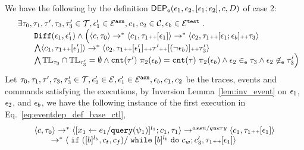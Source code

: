 \begin{subproof}
%
\label{pf:eventdep_base_ctl}
We have the following by the definition $\mathsf{DEP_{\mathtt{e}}}(\mathtt{\epsilon}_1, \mathtt{\epsilon}_2, [\mathtt{\epsilon}_1; \mathtt{\epsilon}_2], c, D)$ of case 2:
\begin{equation}
  \label{eq:eventdep_def_base_ctl}
  \begin{array}{ll}   
    & \exists \mathtt{\tau}_0,
    \mathtt{\tau}_1, \mathtt{\tau}', \mathtt{\tau}_3, \mathtt{\tau}_3' \in \mathcal{T},\mathtt{\epsilon}_1' \in \mathcal{E}^{\mathtt{{asn}}}, {c}_1, {c}_2  \in \mathcal{C}, 
    \mathtt{\epsilon}_b \in \mathcal{E}^{\mathtt{{test}}}
   ~.~ 
    \\ 
   &   \qquad    \mathtt{Diff}(\mathtt{\epsilon}_1, \mathtt{\epsilon}_1') 
\land
   \Big(
  \langle {c}, \mathtt{\tau}_0 \rangle \rightarrow^{*} 
      \langle {c}_1, \mathtt{\tau}_1 {\scriptscriptstyle ++} [\mathtt{\epsilon}_1] \rangle  \rightarrow^{*} 
      \langle c_2,  \mathtt{\tau}_1 {\scriptscriptstyle ++} [\mathtt{\epsilon}_1;\mathtt{\epsilon}_b] {\scriptscriptstyle ++}  \mathtt{\tau}_3 \rangle 
    \\   
   & \qquad \bigwedge 
    \langle {c}_1, \mathtt{\tau}_1 {\scriptscriptstyle ++} [\mathtt{\epsilon}_1'] \rangle  \rightarrow^{*} 
    \langle c_2,  \mathtt{\tau}_1 {\scriptscriptstyle ++} [\mathtt{\epsilon}_1'] {\scriptscriptstyle ++} \mathtt{\tau}' {\scriptscriptstyle ++} [(\neg \mathtt{\epsilon}_b)] {\scriptscriptstyle ++} \mathtt{\tau}_3' \rangle 
    \\
    & \qquad \bigwedge  \mathbb{TL}_{\mathtt{\tau}_3} \cap \mathbb{TL}_{\mathtt{\tau}_3'} = \emptyset
     \land \mathtt{cnt}(\mathtt{\tau}') ~  \pi_2(\mathtt{\epsilon}_b) = \mathtt{cnt}(\mathtt{\tau}) ~  \pi_2(\mathtt{\epsilon}_b)
      \land \mathtt{\epsilon}_2 \in_{\mathtt{e}} \mathtt{\tau}_3
    \land \mathtt{\epsilon}_2 \not\in_{\mathtt{e}} \mathtt{\tau}_3'
   \Big)
 \end{array}
  \end{equation}
%
Let $\mathtt{\tau}_0,
\mathtt{\tau}_1, \mathtt{\tau}', \mathtt{\tau}_3, \mathtt{\tau}_3' \in \mathcal{T}, 
\mathtt{\epsilon}_2' \in \mathcal{E}, \mathtt{\epsilon}_1' \in \mathcal{E}^{\mathtt{{asn}}}, \mathtt{\epsilon}_b, {c}_1, {c}_2$ be the traces, events and commands satisfying the executions,
by Inversion Lemma~\ref{lem:inv_event} on 
$\mathtt{\epsilon}_1$, $\mathtt{\epsilon}_2$, and $\mathtt{\epsilon}_b$,
we have the following instance of the first execution in Eq.~\ref{eq:eventdep_def_base_ctl},
%
\begin{equation}
\label{eq:ctldep_inv1}
  \begin{array}{l}   
\langle {c}, \mathtt{\tau}_0 \rangle \rightarrow^{*} 
\langle [\mathrel{ {x}_1 \leftarrow e_1 / {\tt query}(\psi_1) }]^{l_1} ; {c}_1, \mathtt{\tau}_1 \rangle  
\rightarrow^{assn/query}
 \langle c_1, \mathtt{\tau}_1 {\scriptscriptstyle ++} [\mathtt{\epsilon}_1] \rangle 
 \\
  \qquad \rightarrow^{*} 
  \langle \;\mathtt{if}\; ([b]^{l_b}, c_t, c_f) / \;\mathtt{while}\; [b]^{l_b} \;\mathtt{do}\; c_w;{c}_3', 
  \mathtt{\tau}_1 {\scriptscriptstyle ++} [\mathtt{\epsilon}_1] \rangle 

\end{array}
\end{equation}
\end{subproof}
